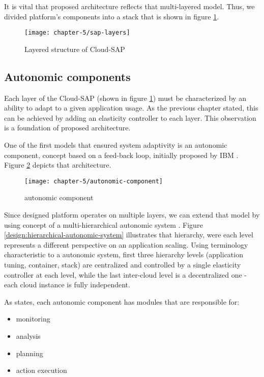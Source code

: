 It is vital that proposed architecture reflects that multi-layered model. Thus, we divided platform's components into a stack that is shown in figure \ref{design:csap-layers}.

\begin{figure}[!ht]
  \begin{center}
    \texttt{[image: chapter-5/sap-layers]}
  \end{center}
  \caption{Layered structure of Cloud-SAP}
  \label{design:csap-layers}
\end{figure}

\subsection{Autonomic components}
Each layer of the Cloud-SAP (shown in figure \ref{design:csap-layers}) must be characterized by an ability to adapt to a given application usage. As the previous chapter stated, this can be achieved by adding an elasticity controller to each layer. This observation is a foundation of proposed architecture.

One of the first models that ensured system adaptivity is an autonomic component, concept based on a feed-back loop, initially proposed by IBM \cite{IBM06}. Figure \ref{design:autonomic-component} depicts that architecture. 

\begin{figure}[!ht]
  \begin{center}
    \texttt{[image: chapter-5/autonomic-component]}
  \end{center}
  \caption{autonomic component}
  \label{design:autonomic-component}
\end{figure}

Since designed platform operates on multiple layers, we can extend that model by using concept of a multi-hierarchical autonomic system \cite{LiWoZh05}. Figure \ref{design:hierarchical-autonomic-system} illustrates that hierarchy, were each level represents a different perspective on an application scaling. Using terminology characteristic to a autonomic system, first three hierarchy levels (application tuning, container, stack) are centralized and controlled by a single elasticity controller at each level, while the last inter-cloud level is a decentralized one - each cloud instance is fully independent.

As \cite{IBM06} states, each autonomic component has modules that are responsible for:
\begin{itemize}
	\item monitoring
	\item analysis
	\item planning
	\item action execution
\end{itemize}

